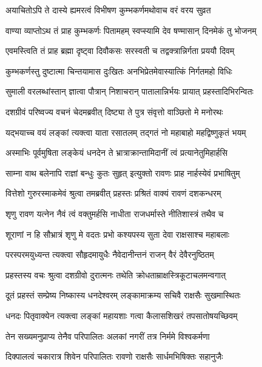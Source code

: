 \twolineshloka
{अयाचितोऽपि ते दास्ये ह्यमरत्वं विभीषण}
{कुम्भकर्णमथोवाच वरं वरय सुव्रत} %

\twolineshloka
{वाण्या व्याप्तोऽथ तं प्राह कुम्भकर्णः पितामहम्}
{स्वप्स्यामि देव षण्मासान् दिनमेकं तु भोजनम्} %

\twolineshloka
{एवमस्त्विति तं प्राह ब्रह्मा दृष्ट्वा दिवौकसः}
{सरस्वती च तद्वक्त्रान्निर्गता प्रययौ दिवम्} %

\twolineshloka
{कुम्भकर्णस्तु दुष्टात्मा चिन्तयामास दुःखितः}
{अनभिप्रेतमेवास्यात्किं निर्गतमहो विधिः} %

\twolineshloka
{सुमाली वरलब्धांस्तान् ज्ञात्वा पौत्रान् निशाचरान्}
{पातालान्निर्भयः प्रायात् प्रहस्तादिभिरन्वितः} %

\twolineshloka
{दशग्रीवं परिष्वज्य वचनं चेदमब्रवीत्}
{दिष्ट्या ते पुत्र संवृत्तो वाञ्छितो मे मनोरथः} %

\twolineshloka
{यद्भयाच्च वयं लङ्कां त्यक्त्वा याता रसातलम्}
{तद्गतं नो महाबाहो महद्विष्णुकृतं भयम्} %

\twolineshloka
{अस्माभिः पूर्वमुषिता लङ्केयं धनदेन ते}
{भ्रात्राक्रान्तामिदानीं त्वं प्रत्यानेतुमिहार्हसि} %

\twolineshloka
{साम्ना वाथ बलेनापि राज्ञां बन्धुः कुतः सुहृत्}
{इत्युक्तो रावणः प्राह नार्हस्येवं प्रभाषितुम्} %

\twolineshloka
{वित्तेशो गुरुरस्माकमेवं श्रुत्वा तमब्रवीत्}
{प्रहस्तः प्रश्रितं वाक्यं रावणं दशकन्धरम्} %

\twolineshloka
{शृणु रावण यत्नेन नैवं त्वं वक्तुमर्हसि}
{नाधीता राजधर्मास्ते नीतिशास्त्रं तथैव च} %

\twolineshloka
{शूराणां न हि सौभ्रात्रं शृणु मे वदतः प्रभो}
{कश्यपस्य सुता देवा राक्षसाश्च महाबलाः} %

\twolineshloka
{परस्परमयुध्यन्त त्यक्त्वा सौहृदमायुधैः}
{नैवेदानीन्तनं राजन् वैरं देवैरनुष्ठितम्} %

\twolineshloka
{प्रहस्तस्य वचः श्रुत्वा दशग्रीवो दुरात्मनः}
{तथेति क्रोधताम्राक्षस्त्रिकूटाचलमन्वगात्} %

\twolineshloka
{दूतं प्रहस्तं सम्प्रेष्य निष्कास्य धनदेश्वरम्}
{लङ्कामाक्रम्य सचिवै राक्षसैः सुखमास्थितः} %

\twolineshloka
{धनदः पितृवाक्येन त्यक्त्वा लङ्कां महायशाः}
{गत्वा कैलासशिखरं तपसातोषयच्छिवम्} %

\twolineshloka
{तेन सख्यमनुप्राप्य तेनैव परिपालितः}
{अलकां नगरीं तत्र निर्ममे विश्वकर्मणा} %

\twolineshloka
{दिक्पालत्वं चकारात्र शिवेन परिपालितः}
{रावणो राक्षसैः सार्धमभिषिक्तः सहानुजैः} %

